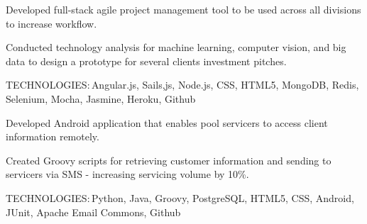 \documentclass[]{cls}
\def\kt{\vspace*{2pt}\textsc{TECHNOLOGIES:\,}}
\begin{document}
\begin{minipage}[t]{0.66\textwidth}
\sectionsep

\begin{tightemize}
\item Developed full-stack agile project management tool to be used across all divisions to increase workflow.

\item Conducted technology analysis for machine learning, computer vision, and big data to design a prototype for several clients investment pitches.

\end{tightemize}
\kt Angular.js, Sails,js, Node.js, CSS, HTML5, MongoDB, Redis, Selenium, Mocha, Jasmine, Heroku, Github



\sectionsep

\begin{tightemize}
\item Developed Android application that enables pool servicers to access client information remotely.

\item Created Groovy scripts for retrieving customer information and sending to servicers via SMS - increasing servicing volume by 10\%.

\end{tightemize}
\kt Python, Java, Groovy, PostgreSQL, HTML5, CSS, Android, JUnit, Apache Email Commons, Github

\end{minipage} 
\end{document}
